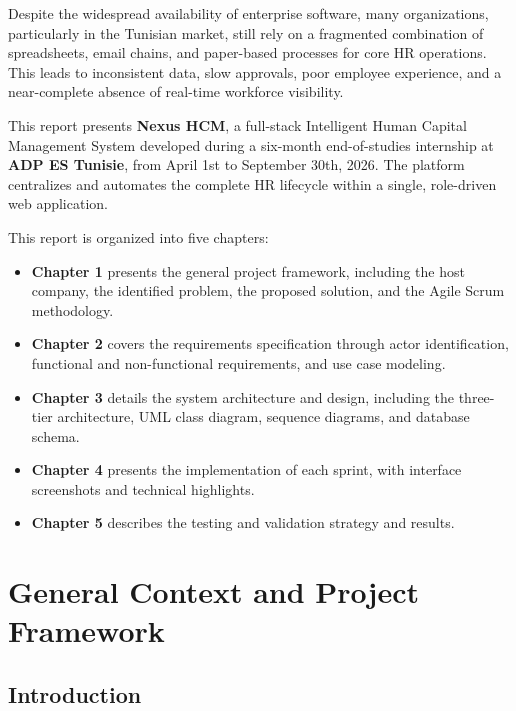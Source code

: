 \documentclass[12pt,a4paper]{report}
\begin{document}
Despite the widespread availability of enterprise software, many organizations, particularly
in the Tunisian market, still rely on a fragmented combination of spreadsheets, email chains,
and paper-based processes for core HR operations. This leads to inconsistent data, slow
approvals, poor employee experience, and a near-complete absence of real-time workforce
visibility.

This report presents \textbf{Nexus HCM}, a full-stack Intelligent Human Capital Management
System developed during a six-month end-of-studies internship at \textbf{ADP ES Tunisie},
from April 1st to September 30th, 2026. The platform centralizes and automates the complete
HR lifecycle within a single, role-driven web application.

This report is organized into five chapters:

\begin{itemize}
  \item \textbf{Chapter 1} presents the general project framework, including the host
    company, the identified problem, the proposed solution, and the Agile Scrum methodology.
  \item \textbf{Chapter 2} covers the requirements specification through actor identification,
    functional and non-functional requirements, and use case modeling.
  \item \textbf{Chapter 3} details the system architecture and design, including the
    three-tier architecture, UML class diagram, sequence diagrams, and database schema.
  \item \textbf{Chapter 4} presents the implementation of each sprint, with interface
    screenshots and technical highlights.
  \item \textbf{Chapter 5} describes the testing and validation strategy and results.
\end{itemize}

\newpage

\chapter{General Context and Project Framework}

\section{Introduction}
\end{document}
